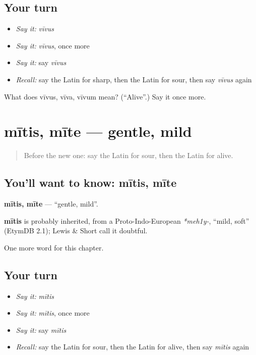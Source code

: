 \subsection*{Your turn}
\begin{itemize}
\raggedright
  \item \emph{Say it:} \emph{vīvus}
  \item \emph{Say it:} \emph{vīvus}, once more
  \item \emph{Say it:} say \emph{vīvus}
  \item \emph{Recall:} say the Latin for sharp, then the Latin for sour, then say \emph{vīvus} again
\end{itemize}

\begin{tcolorbox}[breakable,colback=teal!4,colframe=teal!35!black,title={Before you move on}]
What does vīvus, vīva, vīvum mean? (\textquotedblleft{}Alive\textquotedblright{}.) Say it once more.
\end{tcolorbox}
\section[mītis, mīte]{mītis, mīte — gentle, mild}

\label{lesson:LA-C145-mitis}



\begin{quote}
Before the new one: say the Latin for sour, then the Latin for alive.
\end{quote}

\subsection*{You'll want to know: mītis, mīte}
\textbf{mītis, mīte} — \textquotedblleft{}gentle, mild\textquotedblright{}.

\begin{cousinweb}
\textbf{mītis} is probably inherited, from a Proto-Indo-European \emph{*meh1y-}, \textquotedblleft{}mild, soft\textquotedblright{} (EtymDB 2.1); Lewis \& Short call it doubtful.
\end{cousinweb}

\begin{grammarlens}[title={What you've built}]
One more word for this chapter.
\end{grammarlens}

\subsection*{Your turn}
\begin{itemize}
\raggedright
  \item \emph{Say it:} \emph{mītis}
  \item \emph{Say it:} \emph{mītis}, once more
  \item \emph{Say it:} say \emph{mītis}
  \item \emph{Recall:} say the Latin for sour, then the Latin for alive, then say \emph{mītis} again
\end{itemize}

